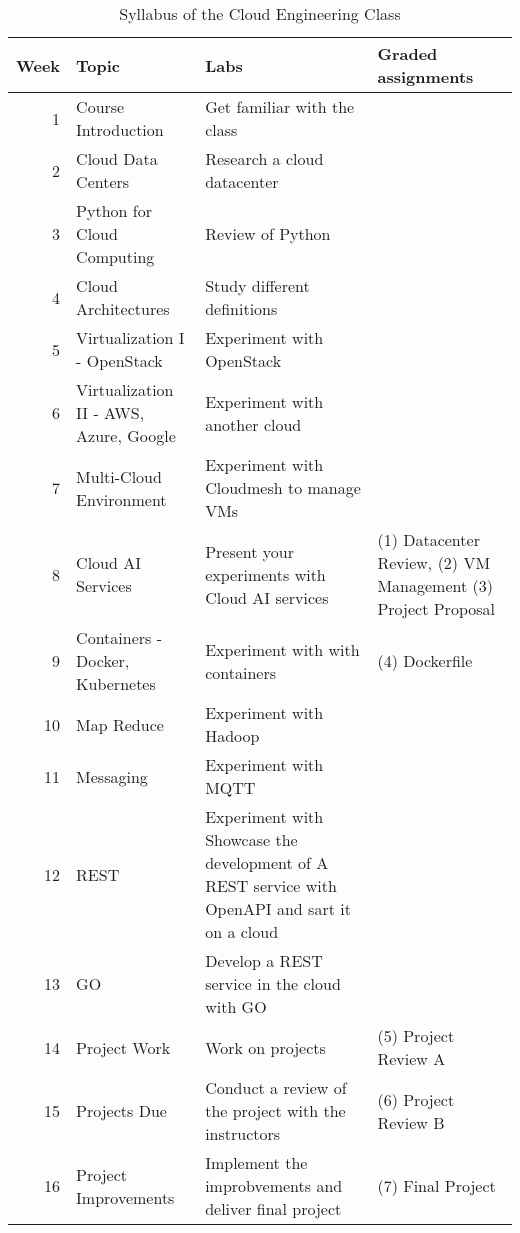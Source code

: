 \begin{table*}[thb]
  \caption{Syllabus of the Cloud Engineering Class}\label{tab:syllabus}
\begin{center}
  \begin{tabular}{|r|l|p{6cm}|p{3cm}|}
    \hline
    Week & Topic & Labs & Graded assignments \\
    \hline
 1    & Course Introduction & Get familiar with the class & \\
    2    & Cloud Data Centers & Research a cloud datacenter & 
    \\
    3    & Python for Cloud Computing &
                                        Review of Python &
                                                    \\
 4    & Cloud Architectures & Study different definitions & \\
 5    & Virtualization I - OpenStack & Experiment with OpenStack & \\
 6    & Virtualization II - AWS, Azure, Google & Experiment with another
                                                   cloud & \\
 7    & Multi-Cloud Environment &Experiment with Cloudmesh to manage VMs & \\
 8    & Cloud AI Services & Present your experiments with Cloud AI
                            services & (1) Datacenter Review, \newline
                                       (2) VM
                                       Management \newline (3) Project
                                       Proposal \\
 9    & Containers - Docker, Kubernetes & Experiment with with
                                          containers & (4) Dockerfile \\
 10   & Map Reduce & Experiment with Hadoop & \\
 11   & Messaging & Experiment with MQTT & \\
 12   & REST & Experiment with Showcase the development of A REST service with OpenAPI
    and sart it on a cloud & \\
 13   & GO  & Develop a REST service in the cloud with GO & \\
 14   & Project Work & Work on projects & (5) Project Review A\\
 15   & Projects Due & Conduct a review of the project with the
                       instructors & (6) Project Review B \\
    16   & Project Improvements & Implement the improbvements and
                                  deliver final project & (7) Final Project
                                                     \\
    \hline
  \end{tabular}
  \end{center}
  \end{table*}
